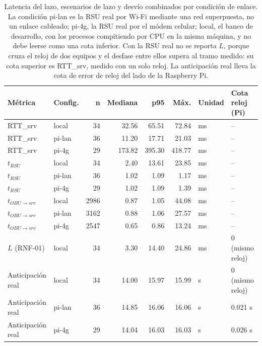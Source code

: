 \begin{table}[H]
\centering
\caption{Latencia del lazo, escenarios de lazo y desvío combinados por condición de enlace. La condición pi-lan es la RSU real por Wi-Fi mediante una red superpuesta, no un enlace cableado; pi-4g, la RSU real por el módem celular; local, el banco de desarrollo, con los procesos compitiendo por CPU en la misma máquina, y no debe leerse como una cota inferior. Con la RSU real no se reporta $L$, porque cruza el reloj de dos equipos y el desfase entre ellos supera al tramo medido: su cota superior es RTT\_srv, medido con un solo reloj. La anticipación real lleva la cota de error de reloj del lado de la Raspberry Pi.}
\label{tab:latencia_campana_centralizada}
\small
\begin{tabular}{llrrrrll}
\toprule
\textbf{Métrica} & \textbf{Config.} & \textbf{n} & \textbf{Mediana} & \textbf{p95} & \textbf{Máx.} & \textbf{Unidad} & \textbf{Cota reloj (Pi)} \\
\midrule
RTT\_srv & local & 34 & 32.56 & 65.51 & 72.84 & ms & -- \\
RTT\_srv & pi-lan & 36 & 11.20 & 17.71 & 21.03 & ms & -- \\
RTT\_srv & pi-4g & 29 & 173.82 & 395.30 & 418.77 & ms & -- \\
$t_{RSU}$ & local & 34 & 2.40 & 13.61 & 23.85 & ms & -- \\
$t_{RSU}$ & pi-lan & 36 & 1.02 & 1.09 & 1.17 & ms & -- \\
$t_{RSU}$ & pi-4g & 29 & 1.02 & 1.09 & 1.39 & ms & -- \\
$t_{OBU\to srv}$ & local & 2986 & 0.87 & 1.05 & 44.08 & ms & -- \\
$t_{OBU\to srv}$ & pi-lan & 3162 & 0.88 & 1.06 & 27.57 & ms & -- \\
$t_{OBU\to srv}$ & pi-4g & 2547 & 0.65 & 0.86 & 13.24 & ms & -- \\
$L$ (RNF-01) & local & 34 & 3.30 & 14.40 & 24.86 & ms & 0 (mismo reloj) \\
Anticipación real & local & 34 & 14.00 & 15.97 & 15.99 & s & 0 (mismo reloj) \\
Anticipación real & pi-lan & 36 & 14.85 & 16.06 & 16.06 & s & 0.021 s \\
Anticipación real & pi-4g & 29 & 14.04 & 16.03 & 16.03 & s & 0.026 s \\
\bottomrule
\end{tabular}
\end{table}
